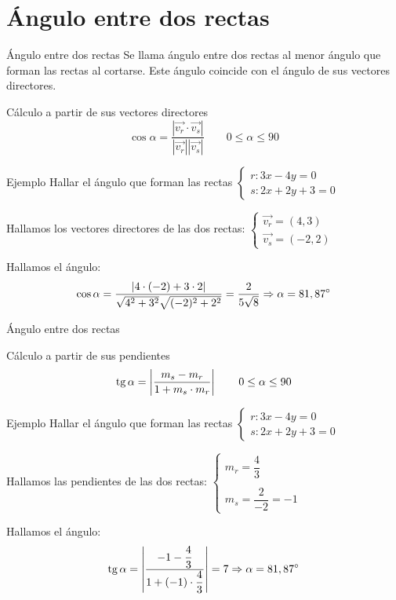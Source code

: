 \documentclass[8pt]{beamer}
\begin{document}
\section{Ángulo entre dos rectas}
\begin{frame}[t]{Ángulo entre dos rectas}
Se llama ángulo entre dos rectas al menor ángulo que forman las rectas al cortarse. Este ángulo coincide con el ángulo de sus vectores directores.
\pause
\begin{alertblock}{Cálculo a partir de sus vectores directores}
\[ \cos \alpha = \dfrac{\left| \vec{v_r}\cdot \vec{v_s}\right|}{\left| \vec{v_r}\right|\left|\vec{v_s}\right|} \qquad 0 \leq \alpha \leq 90 \]
\end{alertblock}
\pause
\begin{exampleblock}{Ejemplo}
Hallar el ángulo que forman las rectas $\begin{cases} r: 3x-4y=0 \\ s: 2x+2y+3=0 \end{cases}$
\end{exampleblock}
\pause
Hallamos los vectores directores de las dos rectas: $\begin{cases} \vec{v_r}=(4,3) \\ \vec{v_s}=(-2,2) \end{cases}$
\pause

Hallamos el ángulo:
\pause
\[ \cos \alpha = \dfrac{| 4 \cdot(-2) +3 \cdot 2 |}{\sqrt{4^2+3^2}\sqrt{(-2)^2+2^2}}= \dfrac{2}{5\sqrt{8}} \Rightarrow \alpha = 81,87 {}^\circ \]

\end{frame}

\begin{frame}[t]{Ángulo entre dos rectas}

\begin{alertblock}{Cálculo a partir de sus pendientes}
\[ \mathop{\rm tg}\nolimits \alpha = \left| \dfrac{m_s - m_r}{1+m_s \cdot m_r }\right| \qquad 0 \leq \alpha \leq 90 \]
\end{alertblock}
\pause
\begin{exampleblock}{Ejemplo}
Hallar el ángulo que forman las rectas $\begin{cases} r: 3x-4y=0 \\ s: 2x+2y+3=0 \end{cases}$
\end{exampleblock}
\pause
Hallamos las pendientes de las dos rectas: $\begin{cases} m_r= \dfrac{4}{3} \\ \\ m_s=\dfrac{2}{-2}=-1 \end{cases}$
\pause

Hallamos el ángulo:
\pause
\[ \mathop{\rm tg}\nolimits \alpha =\left| \dfrac{-1-\dfrac{4}{3}}{1+(-1)\cdot \dfrac{4}{3}} \right|= 7  \Rightarrow \alpha = 81,87 {}^\circ \]

\end{frame}
\end{document}
